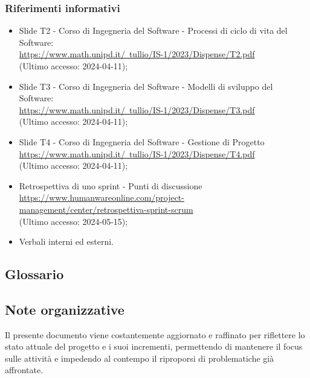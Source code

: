 \subsubsection{Riferimenti informativi}
\begin{itemize}
  \item Slide T2 - Corso di Ingegneria del Software - Processi di ciclo di vita del Software: \\ \href{https://www.math.unipd.it/~tullio/IS-1/2023/Dispense/T2.pdf}{https://www.math.unipd.it/~tullio/IS-1/2023/Dispense/T2.pdf}  \\ (Ultimo accesso: 2024-04-11);
  \item Slide T3 - Corso di Ingegneria del Software - Modelli di sviluppo del Software: \\ \href{https://www.math.unipd.it/~tullio/IS-1/2023/Dispense/T3.pdf}{https://www.math.unipd.it/~tullio/IS-1/2023/Dispense/T3.pdf}  \\ (Ultimo accesso: 2024-04-11);
  \item Slide T4 - Corso di Ingegneria del Software - Gestione di Progetto \\ \href{https://www.math.unipd.it/~tullio/IS-1/2023/Dispense/T4.pdf}{https://www.math.unipd.it/~tullio/IS-1/2023/Dispense/T4.pdf}  \\ (Ultimo accesso: 2024-04-11);
  \item Retrospettiva di uno sprint - Punti di discussione \\ \href{https://www.humanwareonline.com/project-management/center/retrospettiva-sprint-scrum}{https://www.humanwareonline.com/project-management/center/retrospettiva-sprint-scrum}  \\ (Ultimo accesso: 2024-05-15);
  \item Verbali interni ed esterni.
\end{itemize}

\subsection{Glossario} 
\GlossarioIntroduzione

\subsection{Note organizzative}
Il presente documento viene costantemente aggiornato e raffinato per riflettere lo stato attuale del progetto e i suoi incrementi, permettendo di mantenere il focus sulle attività e impedendo al contempo il riproporsi di problematiche già affrontate.
